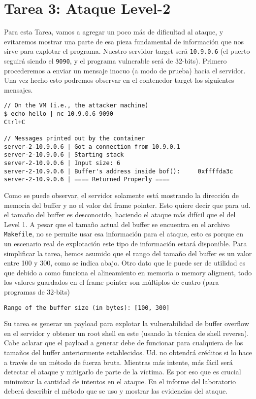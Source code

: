 \section{Tarea 3: Ataque Level-2} 

Para esta Tarea, vamos a agregar un poco más de dificultad al ataque, y evitaremos mostrar una parte de esa pieza fundamental de información que nos sirve para explotar el programa. Nuestro servidor target será \texttt{10.9.0.6} (el puerto seguirá siendo el \texttt{9090}, y el programa vulnerable será de 32-bits). 
Primero procederemos a enviar un mensaje inocuo (a modo de prueba) hacia el servidor.
Una vez hecho esto podremos observar en el contenedor target los siguientes mensajes.

\begin{lstlisting}
// On the VM (i.e., the attacker machine)
$ echo hello | nc 10.9.0.6 9090
Ctrl+C

// Messages printed out by the container
server-2-10.9.0.6 | Got a connection from 10.9.0.1
server-2-10.9.0.6 | Starting stack
server-2-10.9.0.6 | Input size: 6
server-2-10.9.0.6 | Buffer's address inside bof():     0xffffda3c
server-2-10.9.0.6 | ==== Returned Properly ====
\end{lstlisting}

Como se puede observar, el servidor solamente está mostrando la dirección de memoria del buffer y no el valor del frame pointer. Esto quiere decir que para ud. el tamaño del buffer es desconocido, haciendo el ataque más difícil que el del Level 1.
A pesar que el tamaño actual del buffer se encuentra en el archivo \texttt{Makefile}, no se permite usar esa información para el ataque, esto es porque en un escenario real de explotación este tipo de información estará disponible.
Para simplificar la tarea, hemos asumido que el rango del tamaño del buffer es un valor entre 100 y 300, como se indica abajo.
Otro dato que le puede ser de utilidad es que debido a como funciona el alineamiento en memoria o memory aligment, todo los valores guardados en el frame pointer son múltiplos de cuatro (para programas de 32-bits)


\begin{lstlisting}
Range of the buffer size (in bytes): [100, 300]
\end{lstlisting}
 
Su tarea es generar un payload para explotar la vulnerabilidad de buffer overflow en el servidor y obtener un root shell en este (usando la técnica de shell reversa). Cabe aclarar que el payload a generar debe de funcionar para cualquiera de los tamaños del buffer anteriormente establecidos. Ud. no obtendrá créditos si lo hace a través de un método de fuerza bruta. Mientras más intente, más fácil será detectar el ataque y mitigarlo de parte de la víctima. Es por eso que es crucial minimizar la cantidad de intentos en el ataque.
En el informe del laboratorio deberá describir el método que se uso y mostrar las evidencias del ataque.


